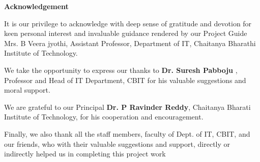 \centerline{\LARGE \bfseries  Acknowledgement}
\vspace{0.5in}

\large{
It is our privilege to acknowledge with deep sense of gratitude and devotion for keen personal interest and invaluable guidance rendered by our Project Guide   Mrs. B Veera jyothi, Assistant Professor, Department of IT, Chaitanya Bharathi Institute of Technology.

\vspace{0.5cm}

We take the opportunity to express our thanks to \textbf{Dr. Suresh Pabboju} , Professor and Head of IT Department, CBIT for his valuable suggestions and moral support.

\vspace{0.5cm}


We are grateful to our Principal \textbf{Dr. P Ravinder Reddy}, Chaitanya Bharati Institute of Technology, for his cooperation and encouragement. 

\vspace{0.5cm}

Finally, we also thank all the staff members, faculty of Dept. of IT, CBIT, and our friends, who with their valuable suggestions and support, directly or indirectly helped us in completing this project work


\vspace{0.5cm} 
}
\newpage